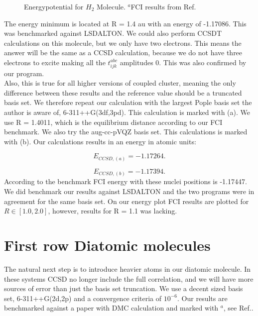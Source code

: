 \documentclass[a4paper,norsk,11pt,twoside]{report}
\begin{document}
\begin{figure}[h!]
\begin{center}
\caption{Energypotential for $H_2$ Molecule. 
$^a$FCI results from Ref.\cite{fci_h2_molecule_stuff}}
\label{fig:h2poten}
\end{center}
\end{figure}

The energy minimum is located at R = 1.4 au with an energy of -1.17086. This was benchmarked against LSDALTON. We could also perform CCSDT calculations on this molecule, but we only have two electrons. This means the answer will be the same as a CCSD calculation, because we do not have three electrons to excite making all the $t_{ijk}^{abc}$ amplitudes 0. This was also confirmed by our program. \\

Also, this is true for all higher versions of coupled cluster, meaning the only difference between these results and the  reference value should be a truncated basis set. We therefore repeat our calculation with the largest Pople basis set the author is aware of, 6-311++G(3df,3pd). This calculation is marked with (a). We use R = 1.4011, which is the equilibrium distance according to our FCI benchmark. We also try the aug-cc-pVQZ basis set. This calculations is marked with (b). Our calculations results in an energy in atomic units:

\begin{equation}
E_{CCSD,(a)} = -1.17264 .
\end{equation}

\begin{equation}
E_{CCSD,(b)} = -1.17394.
\end{equation}
According to the benchmark FCI energy with these nuclei positions is -1.17447. \\

We did benchmark our results against LSDALTON and the two programs were in agreement for the same basis set. On our energy plot FCI results are plotted for $R \in [1.0, 2.0]$, however, results for R = 1.1 was lacking.

\section{First row Diatomic molecules}
The natural next step is to introduce heavier atoms in our diatomic molecule. In these systems CCSD no longer include the full correlation, and we will have more sources of error than just the basis set truncation. We use a decent sized basis set, 6-311++G(2d,2p) and a convergence criteria of $10^{-6}$. Our results are benchmarked against a paper with DMC calculation and marked with $^a$, see Ref.\cite{first_row_diatomic_referance_stuff}. \\
\end{document}
